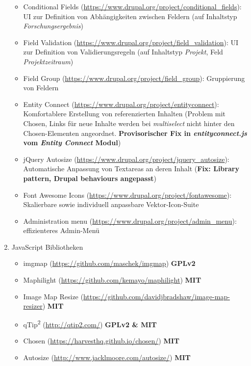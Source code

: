 \begin{enumerate}[parsep=0pt, itemsep=5.0pt plus 2.0pt minus 1.0pt, leftmargin=*]
\begin{itemize}
		\item Conditional Fields (\url{https://www.drupal.org/project/conditional_fields}):
		UI zur Definition von Abhängigkeiten zwischen Feldern (\zB auf Inhaltstyp \textit{Forschungsergebnis})
		
		\item Field Validation (\url{https://www.drupal.org/project/field_validation}):
		UI zur Definition von Validierungsregeln (\zB auf Inhaltstyp \textit{Projekt}, Feld \textit{Projektzeitraum})
		
		\item Field Group (\url{https://www.drupal.org/project/field_group}):
		Gruppierung von Feldern
		
		\item Entity Connect (\url{https://www.drupal.org/project/entityconnect}):
		Komfortablere Erstellung von referenzierten Inhalten 
		(Problem mit Chosen, Links für neue Inhalte werden bei \textit{multiselect} nicht hinter den Chosen-Elementen angeordnet. \textbf{Provisorischer Fix in \textit{entityconnect.js} vom \textit{Entity Connect} Modul})
		
		\item jQuery Autosize (\url{https://www.drupal.org/project/jquery_autosize}):
		Automatische Anpassung von Textareas an deren Inhalt
		(\textbf{Fix: Library pattern, Drupal behaviours angepasst})
		
		\item Font Awesome Icons (\url{https://www.drupal.org/project/fontawesome}):
		Skalierbare sowie individuell anpassbare Vektor-Icon-Suite
			
		\item Administration menu (\url{https://www.drupal.org/project/admin_menu}):
		effizienteres Admin-Menü
	\end{itemize}

	\item JavaScript Bibliotheken
	\begin{itemize}
		\item imgmap (\url{https://github.com/maschek/imgmap})  \textbf{GPLv2}
		\item Maphilight (\url{https://github.com/kemayo/maphilight}) \textbf{MIT}
		\item Image Map Resize (\url{https://github.com/davidjbradshaw/image-map-resizer}) \textbf{MIT}
		\item qTip\textsuperscript{2} (\url{http://qtip2.com/}) \textbf{GPLv2 \& MIT}
		\item Chosen (\url{https://harvesthq.github.io/chosen/}) \textbf{MIT}
		\item Autosize (\url{http://www.jacklmoore.com/autosize/}) \textbf{MIT}
	\end{itemize}


\end{enumerate}

